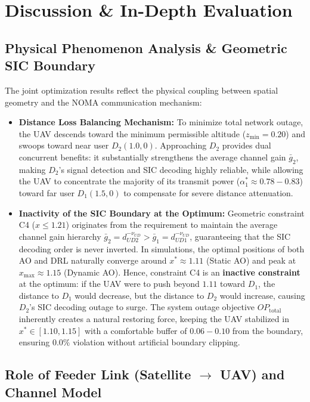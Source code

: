 \section{Discussion \& In-Depth Evaluation}
\label{sec:discussion}

\subsection*{Physical Phenomenon Analysis \& Geometric SIC Boundary}

The joint optimization results reflect the physical coupling between spatial geometry and the NOMA communication mechanism:
\begin{itemize}
    \item \textbf{Distance Loss Balancing Mechanism:} To minimize total network outage, the UAV descends toward the minimum permissible altitude ($z_{\min} = 0.20$) and swoops toward near user $D_2(1.0, 0)$. Approaching $D_2$ provides dual concurrent benefits: it substantially strengthens the average channel gain $\bar{g}_2$, making $D_2$'s signal detection and SIC decoding highly reliable, while allowing the UAV to concentrate the majority of its transmit power ($\alpha_1^* \approx 0.78 - 0.83$) toward far user $D_1(1.5, 0)$ to compensate for severe distance attenuation.
    \item \textbf{Inactivity of the SIC Boundary at the Optimum:} Geometric constraint C4 ($x \le 1.21$) originates from the requirement to maintain the average channel gain hierarchy $\bar{g}_2 = d_{UD2}^{-\nu_{UD}} > \bar{g}_1 = d_{UD1}^{-\nu_{UD}}$, guaranteeing that the SIC decoding order is never inverted. In simulations, the optimal positions of both AO and DRL naturally converge around $x^* \approx 1.11$ (Static AO) and peak at $x_{\max} \approx 1.15$ (Dynamic AO). Hence, constraint C4 is an \textbf{inactive constraint} at the optimum: if the UAV were to push beyond $1.11$ toward $D_1$, the distance to $D_1$ would decrease, but the distance to $D_2$ would increase, causing $D_2$'s SIC decoding outage to surge. The system outage objective $OP_{\text{total}}$ inherently creates a natural restoring force, keeping the UAV stabilized in $x^* \in [1.10, 1.15]$ with a comfortable buffer of $0.06 - 0.10$ from the boundary, ensuring $0.0\%$ violation without artificial boundary clipping.
\end{itemize}

\subsection*{Role of Feeder Link (Satellite $\to$ UAV) and Channel Model}

